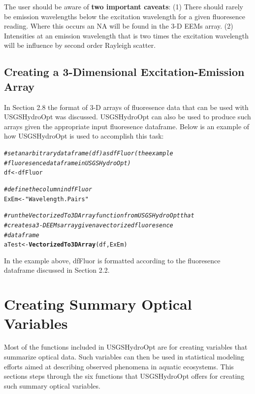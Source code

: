 \documentclass[a4paper,11pt]{article}\usepackage[]{graphicx}\usepackage[]{color}
\makeatletter
\newcommand{\hlstr}[1]{\textcolor[rgb]{0.192,0.494,0.8}{#1}}%
\newcommand{\hlcom}[1]{\textcolor[rgb]{0.678,0.584,0.686}{\textit{#1}}}%
\newcommand{\hlstd}[1]{\textcolor[rgb]{0.345,0.345,0.345}{#1}}%
\newcommand{\hlkwb}[1]{\textcolor[rgb]{0.69,0.353,0.396}{#1}}%
\newcommand{\hlkwd}[1]{\textcolor[rgb]{0.737,0.353,0.396}{\textbf{#1}}}%
\newenvironment{kframe}{%
 \def\at@end@of@kframe{}%
 \ifinner\ifhmode%
  \def\at@end@of@kframe{\end{minipage}}%
  \begin{minipage}{\columnwidth}%
 \fi\fi%
 \def\FrameCommand##1{\hskip\@totalleftmargin \hskip-\fboxsep
 \colorbox{shadecolor}{##1}\hskip-\fboxsep
     \hskip-\linewidth \hskip-\@totalleftmargin \hskip\columnwidth}%
 \MakeFramed {\advance\hsize-\width
   \@totalleftmargin\z@ \linewidth\hsize
   \@setminipage}}%
 {\par\unskip\endMakeFramed%
 \at@end@of@kframe}
\newenvironment{knitrout}{}{} %
\makeatother
\begin{document}
The user should be aware of \textbf{two important caveats}: (1) There should rarely be emission wavelengths below the excitation wavelength for a given fluoresence reading. Where this occurs an NA will be found in the 3-D EEMs array. (2) Intensities at an emission wavelength that is two times the excitation wavelength will be influence by second order Rayleigh scatter. 

\subsection{Creating a 3-Dimensional Excitation-Emission Array}
In Section 2.8 the format of 3-D arrays of fluoresence data that can be used with USGSHydroOpt was discussed. USGSHydroOpt can also be used to produce such arrays given the appropriate input fluoresence dataframe. Below is an example of how USGSHydroOpt is used to accomplish this task: 

\begin{knitrout}
\color{fgcolor}\begin{kframe}
\begin{alltt}
\hlcom{# set an arbitrary data frame (df) as dfFluor (the example}
\hlcom{# fluoresence dataframe in USGSHydroOpt)}
\hlstd{df} \hlkwb{<-} \hlstd{dfFluor}

\hlcom{# define the column in dfFluor}
\hlstd{ExEm} \hlkwb{<-} \hlstr{"Wavelength.Pairs"}

\hlcom{# run the VectorizedTo3DArray function from USGSHydroOpt that}
\hlcom{# creates a 3-D EEMs array given a vectorized fluoresence}
\hlcom{# dataframe}
\hlstd{aTest} \hlkwb{<-} \hlkwd{VectorizedTo3DArray}\hlstd{(df, ExEm)}
\end{alltt}
\end{kframe}
\end{knitrout}

In the example above, dfFluor is formatted according to the fluoresence dataframe discussed in Section 2.2. 

\section{Creating Summary Optical Variables}
Most of the functions included in USGSHydroOpt are for creating variables that summarize optical data. Such variables can then be used in statistical modeling efforts aimed at describing observed phenomena in aquatic ecosystems. This sections steps through the six functions that USGSHydroOpt offers for creating such summary optical variables.
\end{document}
